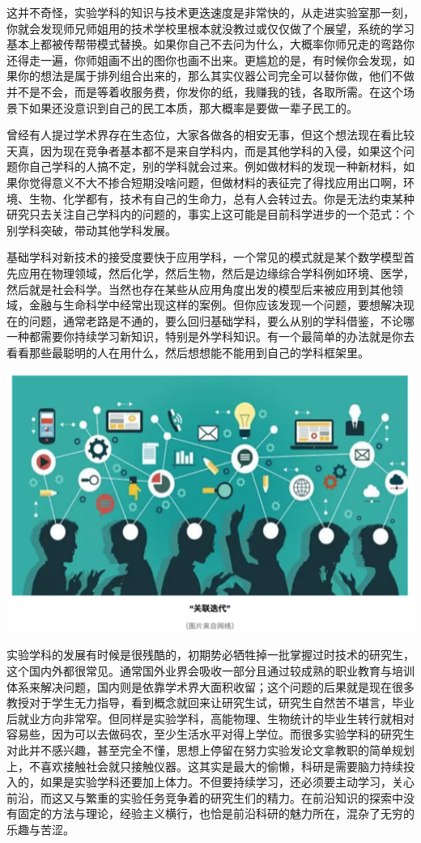 \documentclass[
]{book}
\begin{document}
这并不奇怪，实验学科的知识与技术更迭速度是非常快的，从走进实验室那一刻，你就会发现师兄师姐用的技术学校里根本就没教过或仅仅做了个展望，系统的学习基本上都被传帮带模式替换。如果你自己不去问为什么，大概率你师兄走的弯路你还得走一遍，你师姐画不出的图你也画不出来。更尴尬的是，有时候你会发现，如果你的想法是属于排列组合出来的，那么其实仪器公司完全可以替你做，他们不做并不是不会，而是等着收服务费，你发你的纸，我赚我的钱，各取所需。在这个场景下如果还没意识到自己的民工本质，那大概率是要做一辈子民工的。

曾经有人提过学术界存在生态位，大家各做各的相安无事，但这个想法现在看比较天真，因为现在竞争者基本都不是来自学科内，而是其他学科的入侵，如果这个问题你自己学科的人搞不定，别的学科就会过来。例如做材料的发现一种新材料，如果你觉得意义不大不掺合短期没啥问题，但做材料的表征完了得找应用出口啊，环境、生物、化学都有，技术有自己的生命力，总有人会转过去。你是无法约束某种研究只去关注自己学科内的问题的，事实上这可能是目前科学进步的一个范式：个别学科突破，带动其他学科发展。

基础学科对新技术的接受度要快于应用学科，一个常见的模式就是某个数学模型首先应用在物理领域，然后化学，然后生物，然后是边缘综合学科例如环境、医学，然后就是社会科学。当然也存在某些从应用角度出发的模型后来被应用到其他领域，金融与生命科学中经常出现这样的案例。但你应该发现一个问题，要想解决现在的问题，通常老路是不通的，要么回归基础学科，要么从别的学科借鉴，不论哪一种都需要你持续学习新知识，特别是外学科知识。有一个最简单的办法就是你去看看那些最聪明的人在用什么，然后想想能不能用到自己的学科框架里。

\includegraphics[width=6.67in]{images/hhcs5}

实验学科的发展有时候是很残酷的，初期势必牺牲掉一批掌握过时技术的研究生，这个国内外都很常见。通常国外业界会吸收一部分且通过较成熟的职业教育与培训体系来解决问题，国内则是依靠学术界大面积收留；这个问题的后果就是现在很多教授对于学生无力指导，看到概念就回来让研究生试，研究生自然苦不堪言，毕业后就业方向非常窄。但同样是实验学科，高能物理、生物统计的毕业生转行就相对容易些，因为可以去做码农，至少生活水平对得上学位。而很多实验学科的研究生对此并不感兴趣，甚至完全不懂，思想上停留在努力实验发论文拿教职的简单规划上，不喜欢接触社会就只接触仪器。这其实是最大的偷懒，科研是需要脑力持续投入的，如果是实验学科还要加上体力。不但要持续学习，还必须要主动学习，关心前沿，而这又与繁重的实验任务竞争着的研究生们的精力。在前沿知识的探索中没有固定的方法与理论，经验主义横行，也恰是前沿科研的魅力所在，混杂了无穷的乐趣与苦涩。
\end{document}

